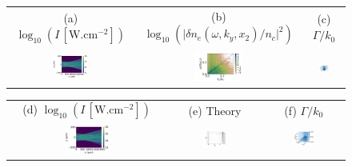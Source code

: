 \documentclass[
 reprint,
 amsmath,amssymb,
 aps,
]{revtex4-1}
\begin{document}
\begin{figure}
\begin{tabular}{ccc}
(a) $\log_{10}(I \,[\mathrm{W.cm^{-2}}] )$&
(b) $\log_{10}(\vert\delta n_e(\omega,k_y,x_2)/n_c\vert^2)$ &
(c) $\Gamma/k_0$\\ 
\includegraphics[width=0.3\textwidth]{I300eV_t65ps.png}
&\includegraphics[width=0.3\textwidth]{dnwk_300eV.png}
&\includegraphics[width=0.3\textwidth]{G300eV.png}
\end{tabular}
\begin{tabular}{ccc}
(d) $\log_{10}(I \,[\mathrm{W.cm^{-2}}] )$&
(e) Theory &
(f) $\Gamma/k_0$\\ 
\includegraphics[width=0.3\textwidth]{I100eV_t65ps.png}
&\includegraphics[width=0.25\textwidth]{gfH100eV.png}
&\includegraphics[width=0.3\textwidth]{G100eV.png}

\end{tabular}
\end{figure}
\end{document}
